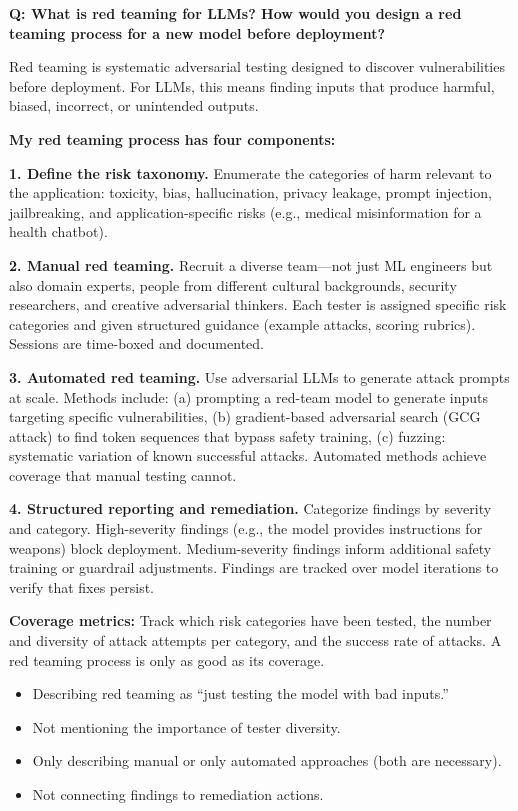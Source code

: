 \begin{interviewq}
\textbf{Q: What is red teaming for LLMs? How would you design a red teaming
process for a new model before deployment?}

 \quad {} \quad \badgefreq{\freqmed}

\stronganswer
Red teaming is systematic adversarial testing designed to discover
vulnerabilities before deployment.  For LLMs, this means finding inputs that
produce harmful, biased, incorrect, or unintended outputs.

\textbf{My red teaming process has four components:}

\textbf{1. Define the risk taxonomy.}  Enumerate the categories of harm
relevant to the application: toxicity, bias, hallucination, privacy leakage,
prompt injection, jailbreaking, and application-specific risks (e.g., medical
misinformation for a health chatbot).

\textbf{2. Manual red teaming.}  Recruit a diverse team---not just ML engineers
but also domain experts, people from different cultural backgrounds, security
researchers, and creative adversarial thinkers.  Each tester is assigned
specific risk categories and given structured guidance (example attacks,
scoring rubrics).  Sessions are time-boxed and documented.

\textbf{3. Automated red teaming.}  Use adversarial LLMs to generate attack
prompts at scale.  Methods include: (a) prompting a red-team model to generate
inputs targeting specific vulnerabilities, (b) gradient-based adversarial
search (GCG attack) to find token sequences that bypass safety training,
(c) fuzzing: systematic variation of known successful attacks.  Automated
methods achieve coverage that manual testing cannot.

\textbf{4. Structured reporting and remediation.}  Categorize findings by
severity and category.  High-severity findings (e.g., the model provides
instructions for weapons) block deployment.  Medium-severity findings inform
additional safety training or guardrail adjustments.  Findings are tracked
over model iterations to verify that fixes persist.

\textbf{Coverage metrics:}  Track which risk categories have been tested, the
number and diversity of attack attempts per category, and the success rate of
attacks.  A red teaming process is only as good as its coverage.

\redflags
\begin{itemize}
    \item Describing red teaming as ``just testing the model with bad inputs.''
    \item Not mentioning the importance of tester diversity.
    \item Only describing manual or only automated approaches (both are
    necessary).
    \item Not connecting findings to remediation actions.
\end{itemize}


\end{interviewq}

